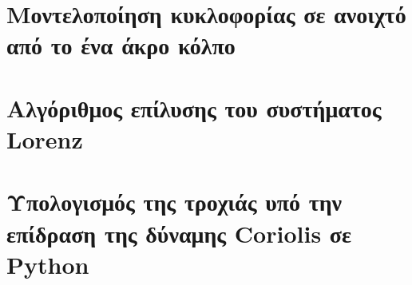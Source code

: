 \documentclass[12pt, a4paper, oneside]{article}
\numberwithin{equation}{subsection}
\def\lat#1{\textlatin{#1}}
\begin{document}
	\section{Μοντελοποίηση κυκλοφορίας σε ανοιχτό από το ένα άκρο κόλπο}
		
	\cleardoublepage
	\nocite{*}
	\lat{}

	\cleardoublepage



	\appendix
		\section{Αλγόριθμος επίλυσης του συστήματος \textlatin{Lorenz}}
		\pagestyle{appendix}
		\label{sec:lorenzPython}
		\lstset{style=withnums}
		
		\cleardoublepage
		\section{Υπολογισμός της τροχιάς υπό την επίδραση της δύναμης Coriolis σε \textlatin{Python}}
		\pagestyle{appendix}
		\label{sec:corPython}
		\lstset{style=withnums}
		
 
\end{document}
